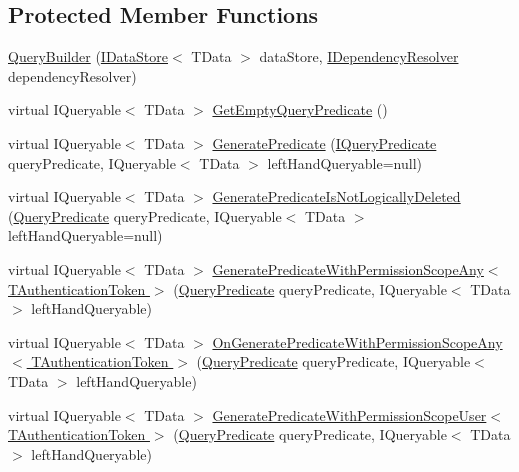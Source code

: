 \subsection*{Protected Member Functions}
\begin{DoxyCompactItemize}
\item 
\hyperlink{classCqrs_1_1Repositories_1_1Queries_1_1QueryBuilder_a8a7b6495f78adedc7b7a82d2c83f17d5}{Query\+Builder} (\hyperlink{interfaceCqrs_1_1DataStores_1_1IDataStore}{I\+Data\+Store}$<$ T\+Data $>$ data\+Store, \hyperlink{interfaceCqrs_1_1Configuration_1_1IDependencyResolver}{I\+Dependency\+Resolver} dependency\+Resolver)
\item 
virtual I\+Queryable$<$ T\+Data $>$ \hyperlink{classCqrs_1_1Repositories_1_1Queries_1_1QueryBuilder_a7dc8f0da3bb4ef54b8cbdda6c50ee0a1}{Get\+Empty\+Query\+Predicate} ()
\item 
virtual I\+Queryable$<$ T\+Data $>$ \hyperlink{classCqrs_1_1Repositories_1_1Queries_1_1QueryBuilder_a553ad69e77d37f28b40e6c9d8e98b716}{Generate\+Predicate} (\hyperlink{interfaceCqrs_1_1Repositories_1_1Queries_1_1IQueryPredicate}{I\+Query\+Predicate} query\+Predicate, I\+Queryable$<$ T\+Data $>$ left\+Hand\+Queryable=null)
\item 
virtual I\+Queryable$<$ T\+Data $>$ \hyperlink{classCqrs_1_1Repositories_1_1Queries_1_1QueryBuilder_a6095cfcbd824578e7c70e2028e1ac6ad}{Generate\+Predicate\+Is\+Not\+Logically\+Deleted} (\hyperlink{classCqrs_1_1Repositories_1_1Queries_1_1QueryPredicate}{Query\+Predicate} query\+Predicate, I\+Queryable$<$ T\+Data $>$ left\+Hand\+Queryable=null)
\item 
virtual I\+Queryable$<$ T\+Data $>$ \hyperlink{classCqrs_1_1Repositories_1_1Queries_1_1QueryBuilder_a7768a63fd46f991f87a00b51484c2f34}{Generate\+Predicate\+With\+Permission\+Scope\+Any$<$ T\+Authentication\+Token $>$} (\hyperlink{classCqrs_1_1Repositories_1_1Queries_1_1QueryPredicate}{Query\+Predicate} query\+Predicate, I\+Queryable$<$ T\+Data $>$ left\+Hand\+Queryable)
\item 
virtual I\+Queryable$<$ T\+Data $>$ \hyperlink{classCqrs_1_1Repositories_1_1Queries_1_1QueryBuilder_aee213115d002518b78463c7bc5fb5c52}{On\+Generate\+Predicate\+With\+Permission\+Scope\+Any$<$ T\+Authentication\+Token $>$} (\hyperlink{classCqrs_1_1Repositories_1_1Queries_1_1QueryPredicate}{Query\+Predicate} query\+Predicate, I\+Queryable$<$ T\+Data $>$ left\+Hand\+Queryable)
\item 
virtual I\+Queryable$<$ T\+Data $>$ \hyperlink{classCqrs_1_1Repositories_1_1Queries_1_1QueryBuilder_a027cb88563991a842002c219d7589426}{Generate\+Predicate\+With\+Permission\+Scope\+User$<$ T\+Authentication\+Token $>$} (\hyperlink{classCqrs_1_1Repositories_1_1Queries_1_1QueryPredicate}{Query\+Predicate} query\+Predicate, I\+Queryable$<$ T\+Data $>$ left\+Hand\+Queryable)

\end{DoxyCompactItemize}
